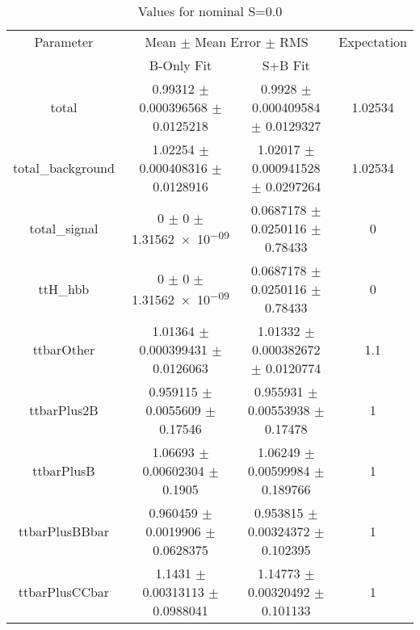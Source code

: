 \begin{table}
\centering
\caption{Values for nominal S=0.0}
\begin{tabular}{cccc}
\toprule
Parameter & \multicolumn{2}{c}{Mean $\pm$ Mean Error $\pm$ RMS} & Expectation\\
 & B-Only Fit & S+B Fit & \\
\midrule
total & \num{0.99312} $\pm$ \num{0.000396568} $\pm$ \num{0.0125218} & \num{0.9928} $\pm$ \num{0.000409584} $\pm$ \num{0.0129327} & \num{1.02534}\\
total\_background & \num{1.02254} $\pm$ \num{0.000408316} $\pm$ \num{0.0128916} & \num{1.02017} $\pm$ \num{0.000941528} $\pm$ \num{0.0297264} & \num{1.02534}\\
total\_signal & \num{0} $\pm$ \num{0} $\pm$ \num{1.31562e-09} & \num{0.0687178} $\pm$ \num{0.0250116} $\pm$ \num{0.78433} & \num{0}\\
ttH\_hbb & \num{0} $\pm$ \num{0} $\pm$ \num{1.31562e-09} & \num{0.0687178} $\pm$ \num{0.0250116} $\pm$ \num{0.78433} & \num{0}\\
ttbarOther & \num{1.01364} $\pm$ \num{0.000399431} $\pm$ \num{0.0126063} & \num{1.01332} $\pm$ \num{0.000382672} $\pm$ \num{0.0120774} & \num{1.1}\\
ttbarPlus2B & \num{0.959115} $\pm$ \num{0.0055609} $\pm$ \num{0.17546} & \num{0.955931} $\pm$ \num{0.00553938} $\pm$ \num{0.17478} & \num{1}\\
ttbarPlusB & \num{1.06693} $\pm$ \num{0.00602304} $\pm$ \num{0.1905} & \num{1.06249} $\pm$ \num{0.00599984} $\pm$ \num{0.189766} & \num{1}\\
ttbarPlusBBbar & \num{0.960459} $\pm$ \num{0.0019906} $\pm$ \num{0.0628375} & \num{0.953815} $\pm$ \num{0.00324372} $\pm$ \num{0.102395} & \num{1}\\
ttbarPlusCCbar & \num{1.1431} $\pm$ \num{0.00313113} $\pm$ \num{0.0988041} & \num{1.14773} $\pm$ \num{0.00320492} $\pm$ \num{0.101133} & \num{1}\\
\bottomrule
\end{tabular}
\end{table}